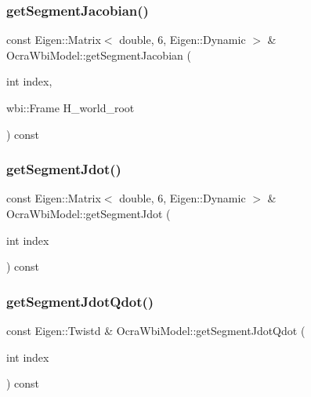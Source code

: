 \subsubsection{\texorpdfstring{get\+Segment\+Jacobian()}{getSegmentJacobian()}\hspace{0.1cm}{\footnotesize\ttfamily [2/2]}}
{\footnotesize\ttfamily const Eigen\+::\+Matrix$<$ double, 6, Eigen\+::\+Dynamic $>$ \& Ocra\+Wbi\+Model\+::get\+Segment\+Jacobian (\begin{DoxyParamCaption}\item[{int}]{index,  }\item[{wbi\+::\+Frame}]{H\+\_\+world\+\_\+root }\end{DoxyParamCaption}) const\hspace{0.3cm}{\ttfamily [virtual]}}

\hypertarget{classocra__icub_1_1OcraWbiModel_aa195933567eef064020e889f4ee7ad94}{}\label{classocra__icub_1_1OcraWbiModel_aa195933567eef064020e889f4ee7ad94} 
\subsubsection{\texorpdfstring{get\+Segment\+Jdot()}{getSegmentJdot()}}
{\footnotesize\ttfamily const Eigen\+::\+Matrix$<$ double, 6, Eigen\+::\+Dynamic $>$ \& Ocra\+Wbi\+Model\+::get\+Segment\+Jdot (\begin{DoxyParamCaption}\item[{int}]{index }\end{DoxyParamCaption}) const\hspace{0.3cm}{\ttfamily [virtual]}}

\hypertarget{classocra__icub_1_1OcraWbiModel_ac013379f185b03cbf092c6388e21ddcc}{}\label{classocra__icub_1_1OcraWbiModel_ac013379f185b03cbf092c6388e21ddcc} 
\subsubsection{\texorpdfstring{get\+Segment\+Jdot\+Qdot()}{getSegmentJdotQdot()}}
{\footnotesize\ttfamily const Eigen\+::\+Twistd \& Ocra\+Wbi\+Model\+::get\+Segment\+Jdot\+Qdot (\begin{DoxyParamCaption}\item[{int}]{index }\end{DoxyParamCaption}) const\hspace{0.3cm}{\ttfamily [virtual]}}

